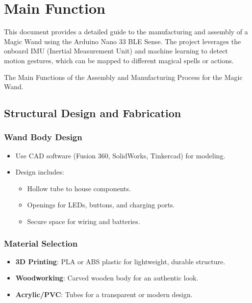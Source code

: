 %
%

\chapter{Main Function}
This document provides a detailed guide to the manufacturing and assembly of a Magic Wand using the Arduino Nano 33 BLE Sense. The project leverages the onboard IMU (Inertial Measurement Unit) and machine learning to detect motion gestures, which can be mapped to different magical spells or actions.

The Main Functions of the Assembly and Manufacturing Process for the Magic Wand.


\section{Structural Design and Fabrication}
\subsection{Wand Body Design}
\begin{itemize}
	\item Use CAD software (Fusion 360, SolidWorks, Tinkercad) for modeling.
	\item Design includes:
	\begin{itemize}
		\item Hollow tube to house components.
		\item Openings for LEDs, buttons, and charging ports.
		\item Secure space for wiring and batteries.
	\end{itemize}
\end{itemize}

\subsection{Material Selection}
\begin{itemize}
	\item \textbf{3D Printing}: PLA or ABS plastic for lightweight, durable structure.
	\item \textbf{Woodworking}: Carved wooden body for an authentic look.
	\item \textbf{Acrylic/PVC}: Tubes for a transparent or modern design.
\end{itemize}


